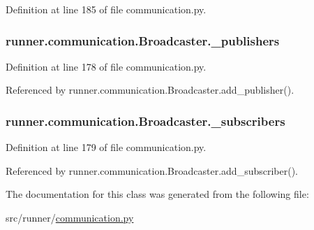 Definition at line 185 of file communication.\+py.

\hypertarget{classrunner_1_1communication_1_1Broadcaster_aa960fb4fe38fa76bd579c89028988052}{}
\subsubsection[{\+\_\+publishers}]{\setlength{\rightskip}{0pt plus 5cm}runner.\+communication.\+Broadcaster.\+\_\+publishers\hspace{0.3cm}{\ttfamily [private]}}\label{classrunner_1_1communication_1_1Broadcaster_aa960fb4fe38fa76bd579c89028988052}


Definition at line 178 of file communication.\+py.



Referenced by runner.\+communication.\+Broadcaster.\+add\+\_\+publisher().

\hypertarget{classrunner_1_1communication_1_1Broadcaster_a6256768ec8eda4dff50b8d04523fcf8a}{}
\subsubsection[{\+\_\+subscribers}]{\setlength{\rightskip}{0pt plus 5cm}runner.\+communication.\+Broadcaster.\+\_\+subscribers\hspace{0.3cm}{\ttfamily [private]}}\label{classrunner_1_1communication_1_1Broadcaster_a6256768ec8eda4dff50b8d04523fcf8a}


Definition at line 179 of file communication.\+py.



Referenced by runner.\+communication.\+Broadcaster.\+add\+\_\+subscriber().



The documentation for this class was generated from the following file\+:\begin{DoxyCompactItemize}
\item 
src/runner/\hyperlink{communication_8py}{communication.\+py}\end{DoxyCompactItemize}
